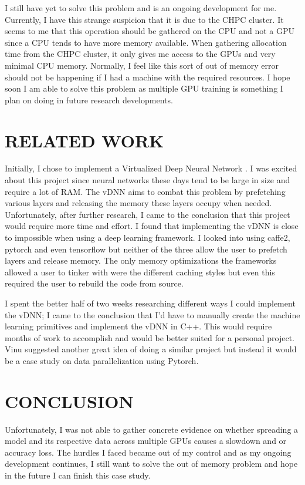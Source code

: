 \documentclass[12pt,conference]{ieeeconf}
\begin{document}
	I still have yet to solve this problem and is an ongoing development for me. Currently, I have this strange suspicion that it is due to the CHPC cluster. It seems to me that this operation should be gathered on the CPU and not a GPU since a CPU tends to have more memory available. When gathering allocation time from the CHPC cluster, it only gives me access to the GPUs and very minimal CPU memory. Normally, I feel like this sort of out of memory error should not be happening if I had a machine with the required resources. I hope soon I am able to solve this problem as multiple GPU training is something I plan on doing in future research developments.	
	
\section{RELATED WORK}
	Initially, I chose to implement a Virtualized Deep Neural Network \cite{VDNN}. I was excited about this project since neural networks these days tend to be large in size and require a lot of RAM. The vDNN aims to combat this problem by prefetching various layers and releasing the memory these layers occupy when needed. Unfortunately, after further research, I came to the conclusion that this project would require more time and effort. I found that implementing the vDNN is close to impossible when using a deep learning framework. I looked into using caffe2, pytorch and even tensorflow but neither of the three allow the user to prefetch layers and release memory. The only memory optimizations the frameworks allowed a user to tinker with were the different caching styles but even this required the user to rebuild the code from source.
	
	I spent the better half of two weeks researching different ways I could implement the vDNN; I came to the conclusion that I'd have to manually create the machine learning primitives and implement the vDNN in C++. This would require months of work to accomplish and would be better suited for a personal project. Vinu suggested another great idea of doing a similar project but instead it would be a case study on data parallelization using Pytorch.

\section{CONCLUSION}
	Unfortunately, I was not able to gather concrete evidence on whether spreading a model and its respective data across multiple GPUs causes a slowdown and or accuracy loss. The hurdles I faced became out of my control and as my ongoing development continues, I still want to solve the out of memory problem and hope in the future I can finish this case study.


\end{document}

